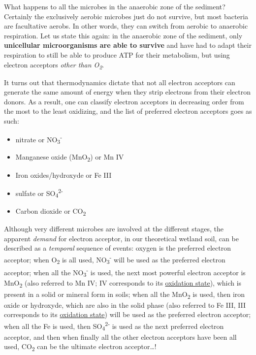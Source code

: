\documentclass[]{book}
\providecommand{\tightlist}{%
  \setlength{\itemsep}{0pt}\setlength{\parskip}{0pt}}
\theoremstyle{definition}
\theoremstyle{definition}
\theoremstyle{definition}
\theoremstyle{remark}
\begin{document}
What happens to all the microbes in the anaerobic zone of the sediment?
Certainly the exclusively aerobic microbes just do not survive, but most
bacteria are facultative aerobs. In other words, they can switch from
aerobic to anaerobic respiration. Let us state this again: in the
anaerobic zone of the sediment, only \textbf{unicellular microorganisms
are able to survive} and have had to adapt their respiration to still be
able to produce ATP for their metabolism, but using electron acceptors
\emph{other than O\textsubscript{2}}.

It turns out that thermodynamics dictate that not all electron acceptors
can generate the same amount of energy when they strip electrons from
their electron donors. As a result, one can classify electron acceptors
in decreasing order from the most to the least oxidizing, and the list
of preferred electron acceptors goes as such:

\begin{itemize}
\tightlist
\item
  nitrate or NO\textsubscript{3}\textsuperscript{-}
\item
  Manganese oxide (MnO\textsubscript{2}) or Mn IV
\item
  Iron oxides/hydroxyde or Fe III
\item
  sulfate or SO\textsubscript{4}\textsuperscript{2-}
\item
  Carbon dioxide or CO\textsubscript{2}
\end{itemize}

Although very different microbes are involved at the different stages,
the apparent \emph{demand} for electron acceptor, in our theoretical
wetland soil, can be described as a \emph{temporal} sequence of events:
oxygen is the preferred electron acceptor; when O\textsubscript{2} is
all used, NO\textsubscript{3}\textsuperscript{-} will be used as the
preferred electron acceptor; when all the
NO\textsubscript{3}\textsuperscript{-} is used, the next most powerful
electron acceptor is MnO\textsubscript{2} (also referred to Mn IV; IV
corresponds to its \protect\hyperlink{oxidation-state}{oxidation
state}), which is present in a solid or mineral form in soils; when all
the MnO\textsubscript{2} is used, then iron oxide or hydroxyde, which
are also in the solid phase (also referred to Fe III, III corresponds to
its \protect\hyperlink{oxidation-state}{oxidation state}) will be used
as the preferred electron acceptor; when all the Fe is used, then
SO\textsubscript{4}\textsuperscript{2-} is used as the next preferred
electron acceptor, and then when finally all the other electron
acceptors have been all used, CO\textsubscript{2} can be the ultimate
electron acceptor\ldots{}!
\end{document}
